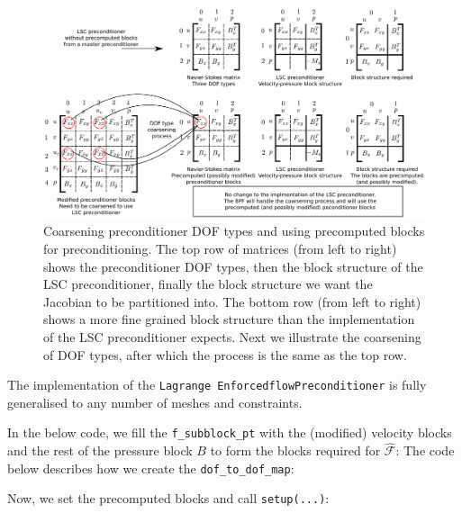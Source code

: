 \begin{figure}[H]
\centering
\includegraphics[width=1\textwidth]{./pic/dof_to_dof_combined.pdf}
\caption{Coarsening preconditioner DOF types and using precomputed blocks for
         preconditioning. The top row of matrices (from left to right) shows 
         the preconditioner DOF types, then the block structure of the LSC
         preconditioner, finally the block structure we want the Jacobian to be
         partitioned into. The bottom row (from left to right) shows a more fine
         grained block structure than the implementation of the LSC preconditioner
         expects. Next we illustrate the coarsening of DOF types, after which
         the process is the same as the top row.}
\label{fig:dof_to_dof_combined}
\end{figure}
The implementation of the \texttt{Lagrange\allowbreak
  Enforcedflow\allowbreak Preconditioner} is fully generalised to any number of meshes
  and constraints.

In the below code, we fill the \texttt{f\_\allowbreak subblock\_\allowbreak pt}
with the (modified) velocity blocks and the rest of the pressure block $B$ to
form the blocks required for $\hat{\mathcal{F}}$: The code below describes how
we create the \texttt{dof\_\allowbreak to\_\allowbreak dof\_\allowbreak map}:

Now, we set the precomputed blocks and call \texttt{setup(...)}:


